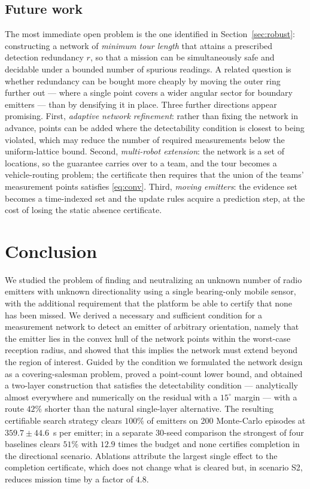 \documentclass[journal,10pt]{IEEEtran}
\theoremstyle{definition}
\begin{document}
\subsection{Future work}
The most immediate open problem is the one identified in
Section~\ref{sec:robust}: constructing a network of \emph{minimum tour length} that attains a
prescribed detection redundancy $r$, so that a mission can be simultaneously safe and decidable
under a bounded number of spurious readings. A related question is whether redundancy can be
bought more cheaply by moving the outer ring further out --- where a single point covers a wider
angular sector for boundary emitters --- than by densifying it in place.
Three further directions appear promising. First, \emph{adaptive network refinement}: rather than
fixing the network in advance, points can be added where the detectability condition is closest to
being violated, which may reduce the number of required measurements below the uniform-lattice
bound. Second, \emph{multi-robot extension}: the network is a set of locations, so the guarantee
carries over to a team, and the tour becomes a vehicle-routing problem; the certificate then
requires that the union of the teams' measurement points satisfies \eqref{eq:conv}. Third,
\emph{moving emitters}: the evidence set becomes a time-indexed set and the update rules acquire a
prediction step, at the cost of losing the static absence certificate.

\section{Conclusion}
We studied the problem of finding and neutralizing an unknown number of radio emitters with
unknown directionality using a single bearing-only mobile sensor, with the additional
requirement that the platform be able to certify that none has been missed. We derived a
necessary and sufficient condition for a measurement network to detect an emitter of arbitrary
orientation, namely that the emitter lies in the convex hull of the network points within the
worst-case reception radius, and showed that this implies the network must extend beyond the region
of interest. Guided by the condition we formulated the network design as a covering-salesman
problem, proved a point-count lower bound, and obtained a two-layer construction that satisfies the detectability condition --- analytically almost everywhere and numerically on the residual with a $15^\circ$ margin --- with a route $42\%$ shorter than the natural single-layer alternative. The resulting
certifiable search strategy clears $100\%$ of emitters on 200 Monte-Carlo episodes at
$359.7\pm44.6$~s per emitter; in a separate $30$-seed comparison the strongest of four baselines
clears $51\%$ with $12.9$ times the budget and none
certifies completion in the directional scenario. Ablations attribute the largest single effect to
the completion certificate, which does not change what is cleared but, in scenario S2, reduces
mission time by a factor of $4.8$.
\end{document}

